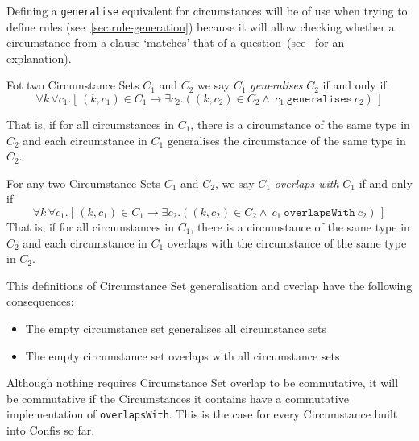 Defining a \texttt{generalise} equivalent for circumstances will be of use when trying to define rules (see~\autoref{sec:rule-generation}) because it will allow checking whether a circumstance from a clause `matches' that of a question~(see~ for an explanation).

\begin{definition}
    \label{def:circumstanceSet:generalise}
    Fot two Circumstance Sets $C_1$ and $C_2$ we say $C_1$ \emph{generalises} $C_2$ if and only if:
    \begin{equation}
        \label{eq:circumstanceSet:generalisation}
        \forall k \, \forall c_1.[ \, (k, c_1) \in C_1 \to
        \exists c_2.((k, c_2) \in C_2  \land\ c_1\ \texttt{generalises}\ c_2)\,]
    \end{equation}

    That is, if for all circumstances in $C_1$, there is a circumstance of the same type in $C_2$ and each circumstance in $C_1$ generalises the circumstance of the same type in $C_2$.
\end{definition}

\begin{definition}
    \label{def:circumstanceSet:overlap}
    For any two Circumstance Sets $C_1$ and $C_2$, we say $C_1$ \emph{overlaps with} $C_1$ if and only if
    \begin{equation}
        \label{eq:circumstanceSet:overlap}
        \forall k \, \forall c_1.[ \, (k, c_1) \in C_1 \to
        \exists c_2.((k, c_2) \in C_2  \land\ c_1\ \texttt{overlapsWith}\ c_2)\,]
    \end{equation}
    That is, if for all circumstances in $C_1$, there is a circumstance of the same type in $C_2$ and each circumstance in $C_1$ overlaps with the circumstance of the same type in $C_2$.
\end{definition}

This definitions of Circumstance Set generalisation and overlap have the following consequences:
\begin{itemize}
    \item The empty circumstance set generalises all circumstance sets
    \item The empty circumstance set overlaps with all circumstance sets
\end{itemize}

Although nothing requires Circumstance Set overlap to be commutative, it will be commutative if the Circumstances it contains have a commutative implementation of \texttt{overlapsWith}.
This is the case for every Circumstance built into Confis so far.

